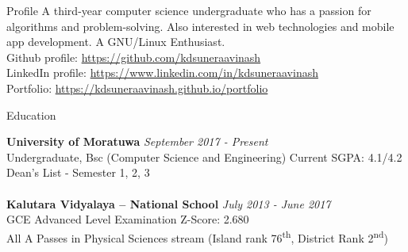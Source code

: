 \documentclass{cv}
\subtitle{344/1, Moonamalgahawatta, Duwa Temple Road, Kalutara South.}  %
\subtitle{(076) 833 6850 \\ \href{mailto:suneraavinash.17@cse.mrt.ac.lk}{suneraavinash.17@cse.mrt.ac.lk}}
\begin{document}
\begin{adjustwidth}{55pt}{0pt}
\vspace{5pt}


    \begin{rSection}{Profile}
A third-year computer science undergraduate who has a passion for algorithms and problem-solving.  
Also interested in web technologies and mobile app development. A GNU/Linux Enthusiast.\\
    Github profile: \url{https://github.com/kdsuneraavinash} \\
    LinkedIn profile: \url{https://www.linkedin.com/in/kdsuneraavinash} \\
    Portfolio: \url{https://kdsuneraavinash.github.io/portfolio} 
\end{rSection}

\begin{rSection}{Education}

{\bf University of Moratuwa}                                \hfill {\em September 2017 - Present} 
\\ Undergraduate, Bsc (Computer Science and Engineering)    \hfill { Current SGPA: 4.1/4.2 }
\\ Dean's List - Semester 1, 2, 3 \\
\\{\bf Kalutara Vidyalaya – National School}                \hfill {\em July 2013 - June 2017} 
\\ GCE Advanced Level Examination                           \hfill { Z-Score: 2.680 }
\\ All A Passes in Physical Sciences stream (Island rank 76\textsuperscript{th}, District Rank 2\textsuperscript{nd}) 
\end{rSection}



\end{adjustwidth}
\end{document}
